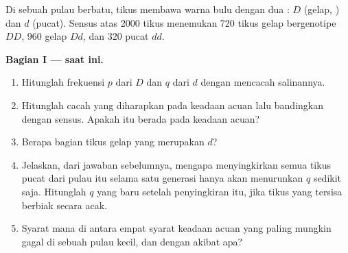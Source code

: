 \begin{problem}
\label{pb:g12:selection-drift-speciation:1}
Di sebuah pulau berbatu, tikus membawa  warna bulu dengan dua : $D$
(gelap, ) dan $d$ (pucat). Sensus atas 2000 tikus menemukan 720 tikus
gelap bergenotipe $DD$, 960 gelap $Dd$, dan 320 pucat $dd$.

\medskip
\noindent\textbf{Bagian I ---  saat ini.}
\begin{enumerate}
  \item Hitunglah frekuensi $p$ dari $D$ dan $q$ dari $d$ dengan
        mencacah salinannya.
  \item Hitunglah cacah  yang diharapkan pada keadaan acuan
        lalu bandingkan dengan sensus. Apakah  itu berada pada
        keadaan acuan?
  \item Berapa bagian tikus gelap yang merupakan  $d$?
  \item Jelaskan, dari jawaban sebelumnya, mengapa menyingkirkan semua
        tikus pucat dari pulau itu selama satu generasi hanya akan
        menurunkan $q$ sedikit saja. Hitunglah $q$ yang baru setelah
        penyingkiran itu, jika tikus yang tersisa berbiak secara acak.
  \item Syarat mana di antara empat syarat keadaan acuan yang paling
        mungkin gagal di sebuah pulau kecil, dan dengan akibat apa?
\end{enumerate}


\end{problem}
